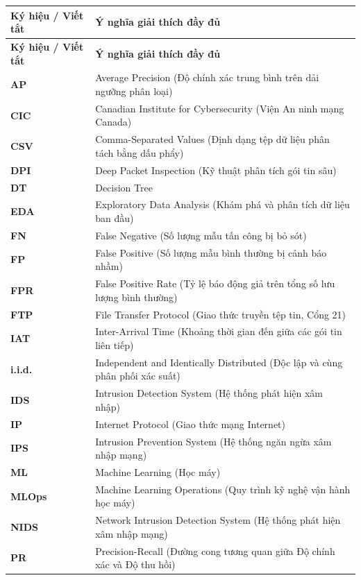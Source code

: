 \begin{longtable}{lp{11.5cm}}
\toprule
\textbf{Ký hiệu / Viết tắt} & \textbf{Ý nghĩa giải thích đầy đủ} \\
\midrule
\endfirsthead
\toprule
\textbf{Ký hiệu / Viết tắt} & \textbf{Ý nghĩa giải thích đầy đủ} \\
\midrule
\endhead
\bottomrule
\endfoot

\textbf{AP} & Average Precision (Độ chính xác trung bình trên dải ngưỡng phân loại) \\
\textbf{CIC} & Canadian Institute for Cybersecurity (Viện An ninh mạng Canada) \\
\textbf{CSV} & Comma-Separated Values (Định dạng tệp dữ liệu phân tách bằng dấu phẩy) \\
\textbf{DPI} & Deep Packet Inspection (Kỹ thuật phân tích gói tin sâu) \\
\textbf{DT} & Decision Tree \\
\textbf{EDA} & Exploratory Data Analysis (Khám phá và phân tích dữ liệu ban đầu) \\
\textbf{FN} & False Negative (Số lượng mẫu tấn công bị bỏ sót) \\
\textbf{FP} & False Positive (Số lượng mẫu bình thường bị cảnh báo nhầm) \\
\textbf{FPR} & False Positive Rate (Tỷ lệ báo động giả trên tổng số lưu lượng bình thường) \\
\textbf{FTP} & File Transfer Protocol (Giao thức truyền tệp tin, Cổng 21) \\
\textbf{IAT} & Inter-Arrival Time (Khoảng thời gian đến giữa các gói tin liên tiếp) \\
\textbf{i.i.d.} & Independent and Identically Distributed (Độc lập và cùng phân phối xác suất) \\
\textbf{IDS} & Intrusion Detection System (Hệ thống phát hiện xâm nhập) \\
\textbf{IP} & Internet Protocol (Giao thức mạng Internet) \\
\textbf{IPS} & Intrusion Prevention System (Hệ thống ngăn ngừa xâm nhập mạng) \\
\textbf{ML} & Machine Learning (Học máy) \\
\textbf{MLOps} & Machine Learning Operations (Quy trình kỹ nghệ vận hành học máy) \\
\textbf{NIDS} & Network Intrusion Detection System (Hệ thống phát hiện xâm nhập mạng) \\
\textbf{PR} & Precision-Recall (Đường cong tương quan giữa Độ chính xác và Độ thu hồi) \\

\end{longtable}
